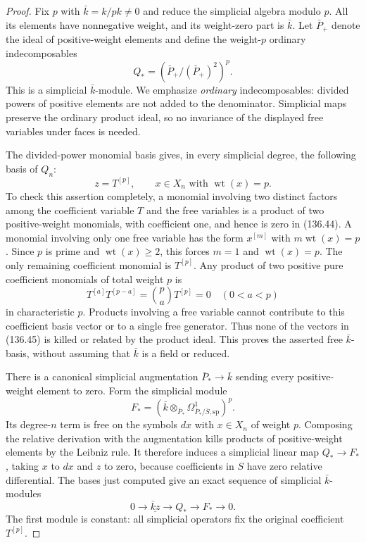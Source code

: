 \begin{proof}
Fix $p$ with $\bar k=k/pk\ne0$ and reduce the
simplicial algebra modulo $p$.  All its elements
have nonnegative weight, and its weight-zero part
is $\bar k$.  Let $\bar P_+$ denote the ideal of
positive-weight elements and define the weight-$p$
ordinary indecomposables
\[
                  Q_*=(\bar P_+/(\bar P_+)^2)^p.
                                                               \tag{136.44}
\]
This is a simplicial $\bar k$-module.  We emphasize
\emph{ordinary} indecomposables: divided powers of
positive elements are not added to the denominator.
Simplicial maps preserve the ordinary product ideal,
so no invariance of the displayed free variables
under faces is needed.

The divided-power monomial basis gives, in every
simplicial degree, the following basis of $Q_n$:
\[
       z=T^{[p]},\qquad x\in X_n\text{ with }
                                      \operatorname{wt}(x)=p.
                                                               \tag{136.45}
\]
To check this assertion completely, a monomial
involving two distinct factors among the coefficient
variable $T$ and the free variables is a product of
two positive-weight monomials, with coefficient one,
and hence is zero in (136.44).  A monomial involving
only one free variable has the form $x^{[m]}$ with
$m\operatorname{wt}(x)=p$.  Since $p$ is prime and
$\operatorname{wt}(x)\geq2$, this forces $m=1$
and $\operatorname{wt}(x)=p$.  The only remaining
coefficient monomial is $T^{[p]}$.  Any product
of two positive pure coefficient monomials of
total weight $p$ is
\[
           T^{[a]}T^{[p-a]}=\binom pa T^{[p]}=0
                    \quad(0<a<p)                         \tag{136.46}
\]
in characteristic $p$.  Products involving a free
variable cannot contribute to this coefficient
basis vector or to a single free generator.
Thus none of the vectors in (136.45) is killed or
related by the product ideal.  This proves the
asserted free $\bar k$-basis, without assuming that
$\bar k$ is a field or reduced.

There is a canonical simplicial augmentation
$\bar P_*\to\bar k$ sending every positive-weight
element to zero.  Form the simplicial module
\[
 F_*=
 \left(\bar k\otimes_{\bar P_*}
              \Omega^1_{\bar P_*/\bar S,\mathrm{sp}}\right)^p.
                                                               \tag{136.47}
\]
Its degree-$n$ term is free on the symbols $dx$
with $x\in X_n$ of weight $p$.  Composing the
relative derivation with the augmentation kills
products of positive-weight elements by the
Leibniz rule.  It therefore induces a simplicial
linear map $Q_*\to F_*$, taking $x$ to $dx$ and
$z$ to zero, because coefficients in $S$ have
zero relative differential.  The bases just
computed give an exact sequence of simplicial
$\bar k$-modules
\[
 0\longrightarrow\underline{\bar k z}
       \longrightarrow Q_*
       \longrightarrow F_*\longrightarrow0.              \tag{136.48}
\]
The first module is constant: all simplicial
operators fix the original coefficient $T^{[p]}$.


\end{proof}
